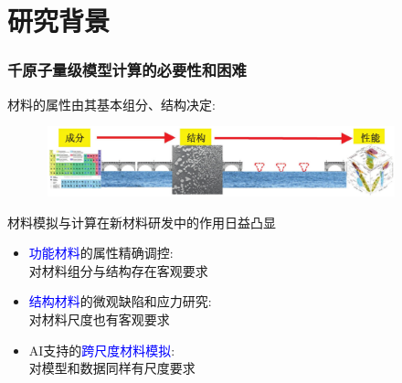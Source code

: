 \small
\section{研究背景}
\begin{frame}
	\frametitle{千原子量级模型计算的必要性和困难}
		材料的属性由其基本组分、结构决定:
\begin{figure}[h!]
\vspace*{-0.10in}
\includegraphics[height=0.80in,width=4.05in]{Figures/MGE-2.png}
\label{Multi-Scale-1}
\end{figure}
	材料模拟与计算在新材料研发中的作用日益凸显
	\begin{itemize}
		\item \textcolor{blue}{功能材料}的属性精确调控:\\
			对材料组分与结构存在客观要求
		\item \textcolor{blue}{结构材料}的微观缺陷和应力研究:\\
			对材料尺度也有客观要求
		\item \textrm{AI}支持的\textcolor{blue}{跨尺度材料模拟}:\\
			对模型和数据同样有尺度要求
	\end{itemize}
\end{frame}


